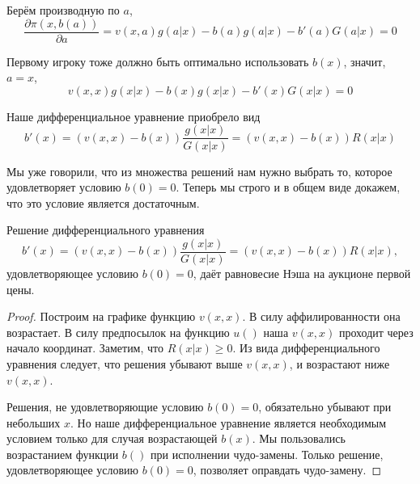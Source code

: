 \begin{itemize}
Берём производную по $ a $,
\begin{equation}
\frac{\partial \pi(x,b(a))}{\partial a}=v(x,a)g(a|x)-b(a)g(a|x)-b'(a)G(a|x)=0
\end{equation}

Первому игроку тоже должно быть оптимально использовать $ b(x) $, значит, $ a=x $,
\begin{equation}
v(x,x)g(x|x)-b(x)g(x|x)-b'(x)G(x|x)=0
\end{equation}

Наше дифференциальное уравнение приобрело вид
\begin{equation}
\label{b_first_de}
b'(x)=(v(x,x)-b(x))\frac{g(x|x)}{G(x|x)}=(v(x,x)-b(x))R(x|x)
\end{equation}

Мы уже говорили, что из множества решений нам нужно выбрать то, которое удовлетворяет условию $ b(0)=0 $. Теперь мы строго и в общем виде докажем, что это условие является достаточным.


\begin{myth}
Решение дифференциального уравнения
\begin{equation}
b'(x)=(v(x,x)-b(x))\frac{g(x|x)}{G(x|x)}=(v(x,x)-b(x))R(x|x),
\end{equation}
удовлетворяющее условию $ b(0)=0 $, даёт равновесие Нэша на аукционе первой цены.
\end{myth}

\begin{proof}


Построим на графике функцию $ v(x,x) $. В силу аффилированности она возрастает. В силу предпосылок на функцию $ u() $ наша $ v(x,x) $ проходит через начало координат. Заметим, что $ R(x|x)\geq 0 $. Из вида дифференциального уравнения следует, что решения убывают выше $ v(x,x) $, и возрастают ниже $ v(x,x) $.




Решения, не удовлетворяющие условию $ b(0)=0 $, обязательно убывают при небольших $ x $. Но наше дифференциальное уравнение является необходимым условием только для случая возрастающей $ b(x) $. Мы пользовались возрастанием функции $ b() $ при исполнении чудо-замены. Только решение,  удовлетворяющее условию $ b(0)=0 $, позволяет оправдать чудо-замену.


\end{proof}
\end{itemize}
